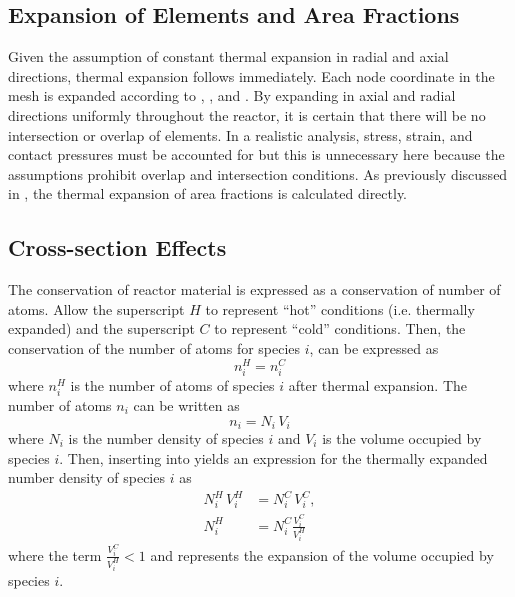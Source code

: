   \subsection{Expansion of Elements and Area Fractions}
    Given the assumption of constant thermal expansion in radial and axial
    directions, thermal expansion follows immediately. Each node coordinate in
    the mesh is expanded according to , ,
    and . By expanding in axial and radial directions
    uniformly throughout the reactor, it is certain that there will be no
    intersection or overlap of elements. In a realistic analysis, stress,
    strain, and contact pressures must be accounted for but this is unnecessary
    here because the assumptions prohibit overlap and intersection conditions.
    As previously discussed in
    , the thermal expansion of
    area fractions is calculated directly.

  \subsection{Cross-section Effects}
    \label{sec:cross-section_effects}
    The conservation of reactor material is expressed as a conservation of 
    number of atoms. Allow the superscript $H$ to represent ``hot'' conditions 
    (i.e.  thermally expanded) and the superscript $C$ to represent ``cold'' 
    conditions.  Then, the conservation of the number of atoms for species $i$, 
    can be expressed as
    \begin{equation}
      \label{eq:conservation}
      n_i^H = n_i^C 
    \end{equation}
    where $n_i^H$ is the number of atoms of species $i$ after thermal expansion.
    The number of atoms $n_i$ can be written as 
    \begin{equation}
      \label{eq:nden_definition}
      n_i = N_i \, V_i
    \end{equation}
    where $N_i$ is the number density of species $i$ and $V_i$ is the volume
    occupied by species $i$. Then, inserting  into 
     yields an expression for the thermally expanded 
    number density of species $i$ as
    \begin{align}
      N_i^H \, V_i^H &= N_i^C \, V_i^C, \\
      \label{eq:nden_volume_ratio}
      N_i^H &= N_i^C \frac{V_i^C}{V_i^H}
    \end{align}
    where the term $\frac{V_i^C}{V_i^H} < 1$ and represents the expansion of the
    volume occupied by species $i$. 


